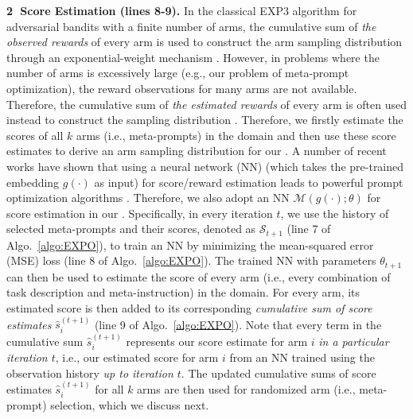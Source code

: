 \textbf{{\textcircled{\scriptsize 2}} Score Estimation (lines 8-9).}
In the classical EXP3 algorithm for adversarial bandits with a finite number of arms, the cumulative sum of \emph{the observed rewards} of every arm is used to construct the arm sampling distribution through an exponential-weight mechanism \cite{lattimore2020bandit}.
However, in problems where the number of arms is excessively large (e.g., our problem of meta-prompt optimization), the reward observations for many arms are not available.
Therefore, the cumulative sum of \emph{the estimated rewards} of every arm is often used instead to construct the sampling distribution
\cite{lattimore2020bandit}.
Therefore, we firstly estimate the scores of all $k$ arms (i.e., meta-prompts) in the domain and then 
use these score estimates to derive an arm sampling distribution for our \alg.
A number of recent works have shown that using a neural network (NN) (which takes the pre-trained embedding $g(\cdot)$ as input) for score/reward estimation leads to powerful prompt optimization algorithms \cite{lin2024prompt,lin2023instinct,wu2024prompt}.
Therefore, we also adopt an NN $\mathcal{M}(g(\cdot); \theta)$ for score estimation in our \alg.
Specifically, in every iteration $t$, we use the history of selected meta-prompts and their scores, denoted as $\mathcal{S}_{t+1}$ (line 7 of Algo.~\ref{algo:EXPO}), to train an NN
by minimizing the mean-squared error (MSE) loss (line 8 of Algo.~\ref{algo:EXPO}).
The trained NN with parameters $\theta_{t+1}$ can then be used to estimate the score of every arm (i.e., every combination of task description and meta-instruction) in the domain.
For every arm,
its estimated score is then added to its corresponding \emph{cumulative sum of score estimates} $\hat{s}_i^{(t+1)}$ (line 9 of Algo.~\ref{algo:EXPO}).
Note that every term in the cumulative sum $\hat{s}_i^{(t+1)}$ represents our score estimate for arm $i$ \emph{in a particular iteration $t$}, i.e., our estimated score for arm $i$ from an NN trained using the observation history \emph{up to iteration $t$}.
The updated cumulative sums of score estimates $\hat{s}_i^{(t+1)}$ for all $k$ arms are then used for randomized arm (i.e., meta-prompt) selection, which we discuss next.

